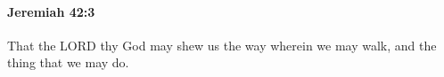 
		\paragraph{Jeremiah 42:3} %
			\label{JEREMIAH-42-3}

			That the LORD thy God may shew us the way wherein we may walk, and the thing that we may do.


